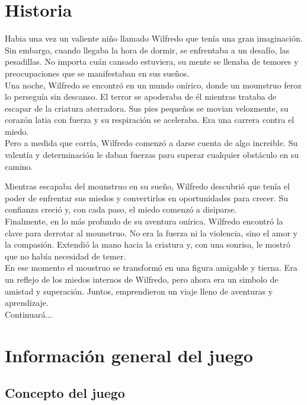 \section{Historia}

Habia una vez un valiente niño llamado Wilfredo que tenía una gran
imaginación. Sin embargo, cuando llegaba la hora de dormir, se
enfrentaba a un desafío, las pesadillas. No importa cuán cansado
estuviera, su mente se llenaba de temores y preocupaciones que se
manifestaban en sus sueños.\\

Una noche, Wilfredo se encontró en un mundo onírico, donde un mounstruo
feroz lo perseguía sin descanso. El terror se apoderaba de él mientras
trataba de escapar de la criatura aterradora. Sus pies pequeños se movian
velozmente, su corazón latia con fuerza y su respiración se aceleraba. Era
una carrera contra el miedo.\\

Pero a medida que corría, Wilfredo comenzó a darse cuenta de algo increible.
Su valentía y determinación le daban fuerzas para superar cualquier obstáculo
en su camino.

Mientras escapaba del mounstruo en su sueño, Wilfredo descubrió que tenía el
poder de enfrentar sus miedos y convertirlos en oportunidades para crecer.
Su confianza creció y, con cada paso, el miedo comenzó a disiparse.\\

Finalmente, en lo más profundo de su aventura onírica. Wilfredo encontró la clave
para derrotar al mounstruo. No era la fuerza ni la violencia, sino el amor y la
compasión. Extendió la mano hacia la criatura y, con una sonrisa, le mostró que no
había necesidad de temer.\\

En ese momento el moustruo se transformó en una figura amigable y tierna. Era un
reflejo de los miedos internos de Wilfredo, pero ahora era un simbolo de
amistad y superación. Juntos, emprendieron un viaje lleno de aventuras y aprendizaje.\\


Continuará...

\section{Información general del juego}

\subsection{Concepto del juego}

